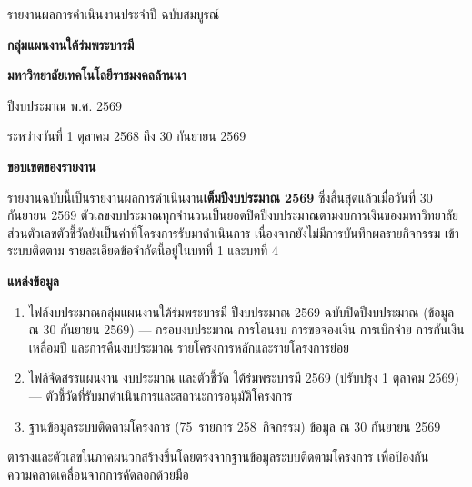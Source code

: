 \cleardoublepage
\thispagestyle{empty}
\vspace*{3.2cm}
\begin{center}
{\Large รายงานผลการดำเนินงานประจำปี ฉบับสมบูรณ์}\par\vspace{18pt}
{\huge\bfseries\color{FirstBlue} กลุ่มแผนงานใต้ร่มพระบารมี}\par\vspace{10pt}
{\Large\bfseries มหาวิทยาลัยเทคโนโลยีราชมงคลล้านนา}\par\vspace{14pt}
{\Large ปีงบประมาณ พ.ศ. 2569}\par\vspace{6pt}
{\large ระหว่างวันที่ 1 ตุลาคม 2568 ถึง 30 กันยายน 2569}\par
\vspace{2.4cm}

\begin{minipage}{0.86\textwidth}
\small
\textbf{\color{FirstBlue}ขอบเขตของรายงาน}\par\vspace{4pt}
รายงานฉบับนี้เป็นรายงานผลการดำเนินงาน\textbf{เต็มปีงบประมาณ 2569} ซึ่งสิ้นสุดแล้วเมื่อวันที่
30 กันยายน 2569 ตัวเลขงบประมาณทุกจำนวนเป็นยอดปิดปีงบประมาณตามงบการเงินของมหาวิทยาลัย
ส่วนตัวเลขตัวชี้วัดยังเป็นค่าที่โครงการรับมาดำเนินการ เนื่องจากยังไม่มีการบันทึกผลรายกิจกรรม
เข้าระบบติดตาม รายละเอียดข้อจำกัดนี้อยู่ในบทที่ 1 และบทที่ 4
\par\vspace{14pt}

\textbf{\color{FirstBlue}แหล่งข้อมูล}\par\vspace{4pt}
\begin{enumerate}[leftmargin=1.5em,itemsep=1pt,topsep=2pt]
  \item ไฟล์งบประมาณกลุ่มแผนงานใต้ร่มพระบารมี ปีงบประมาณ 2569 ฉบับปิดปีงบประมาณ (ข้อมูล ณ 30 กันยายน 2569) --- กรอบงบประมาณ การโอนงบ การขอจองเงิน การเบิกจ่าย การกันเงินเหลื่อมปี และการคืนงบประมาณ รายโครงการหลักและรายโครงการย่อย
  \item ไฟล์จัดสรรแผนงาน งบประมาณ และตัวชี้วัด ใต้ร่มพระบารมี 2569 (ปรับปรุง 1 ตุลาคม 2569) --- ตัวชี้วัดที่รับมาดำเนินการและสถานะการอนุมัติโครงการ
  \item ฐานข้อมูลระบบติดตามโครงการ (75~รายการ 258~กิจกรรม) ข้อมูล ณ 30 กันยายน 2569
\end{enumerate}
\end{minipage}
\end{center}
\vfill
\begin{center}\footnotesize
ตารางและตัวเลขในภาคผนวกสร้างขึ้นโดยตรงจากฐานข้อมูลระบบติดตามโครงการ เพื่อป้องกันความคลาดเคลื่อนจากการคัดลอกด้วยมือ
\end{center}
